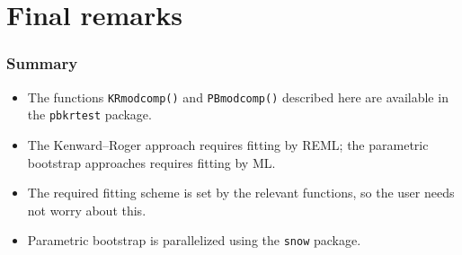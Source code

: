 \documentclass[compress]{beamer}\usepackage[]{graphicx}\usepackage[]{color}
\newenvironment{sframe}
{\begin{frame} [containsverbatim] }
  {\end{frame}}
\begin{document}


\section{Final remarks}
\label{sec:final-remarks}

\begin{sframe}
  \frametitle{Summary}

  \begin{itemize}
  \item   The functions \verb'KRmodcomp()' and \verb'PBmodcomp()' 
    described here are available in the \verb+pbkrtest+ package.

    
  \item The Kenward--Roger approach requires fitting by REML; the parametric
  bootstrap approaches requires fitting by ML.


\item The required fitting scheme is set by the relevant functions, so the
  user needs not worry about this.


\item Parametric bootstrap is parallelized using the \verb'snow'
  package. 
  
  \end{itemize}
  

\end{sframe}
\end{document}
